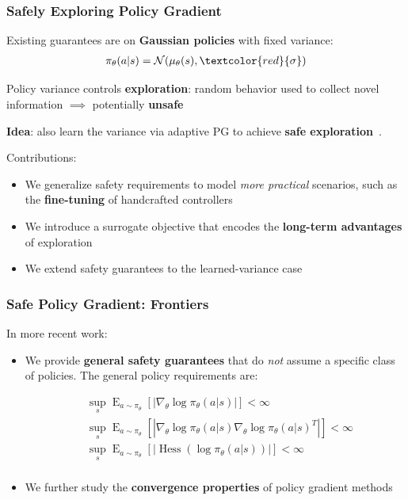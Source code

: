 \documentclass{beamer}
\begin{document}
\begin{frame}
\frametitle{Safely Exploring Policy Gradient}
Existing guarantees are on \textbf{Gaussian policies} with fixed variance:
\begin{align*}
	\pi_{\theta}(a \vert s) = \mathcal{N}(\mu_{\theta}(s), \textcolor{red}{\mathbf{\sigma}})
\end{align*}

Policy variance controls \textbf{exploration}: random behavior used to collect novel information $\implies$ potentially \textbf{unsafe}

\vfill

\textbf{Idea}: also learn the variance via adaptive PG to achieve \textbf{safe exploration}~\cite{amodei2016concrete}.

\vfill

Contributions:
\begin{itemize}
	\item We generalize safety requirements to model \textit{more practical} scenarios, such as the \textbf{fine-tuning} of handcrafted controllers
	\item We introduce a surrogate objective that encodes the \textbf{long-term advantages} of exploration
	\item We extend safety guarantees to the learned-variance case
\end{itemize}
\end{frame}


\begin{frame}
\frametitle{Safe Policy Gradient: Frontiers}
In more recent work:
\begin{itemize}
	\item We provide \textbf{general safety guarantees} that do \textit{not} assume a specific class of policies. The general policy requirements are:
	
	\begin{align*}
		&\sup_{s}\mathop{E}_{a\sim\pi_{\theta}}\left[\left|\nabla_{\theta}\log\pi_{\theta}(a\vert s)\right|\right] < \infty \\
		&\sup_{s}\mathop{E}_{a\sim\pi_{\theta}}\left[\left|\nabla_{\theta}\log\pi_{\theta}(a\vert s)\nabla_{\theta}\log\pi_{\theta}(a\vert s)^T\right|\right] < \infty \\
		&\sup_{s}\mathop{E}_{a\sim\pi_{\theta}}\left[\left|\mathop{Hess}\left(\log\pi_{\theta}(a\vert s)\right)\right|\right] < \infty \\
	\end{align*}
	
	\item We further study the \textbf{convergence properties} of policy gradient methods
\end{itemize}

\end{frame}
\end{document}
